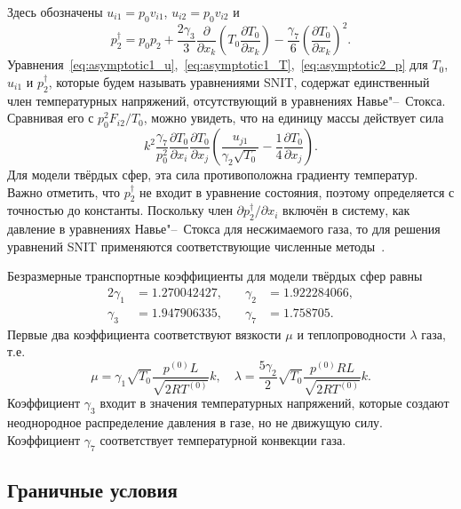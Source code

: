 \documentclass[10pt]{article}
\newcommand{\pder}[2][]{\frac{\partial#1}{\partial#2}}
\begin{document}
Здесь обозначены \(u_{i1} = p_0v_{i1}\), \(u_{i2} = p_0v_{i2}\) и
\begin{equation}\label{eq:dag_pressure}
    p_2^\dag = p_0 p_2
        + \frac{2\gamma_3}{3}\pder{x_k}\left(T_0\pder[T_0]{x_k}\right)
        - \frac{\gamma_7}{6}\left(\pder[T_0]{x_k}\right)^2.
\end{equation}
Уравнения~\eqref{eq:asymptotic1_u},~\eqref{eq:asymptotic1_T},~\eqref{eq:asymptotic2_p}
для \(T_0\), \(u_{i1}\) и \(p_2^\dag\), которые будем называть уравнениями SNIT,
содержат единственный член температурных напряжений, отсутствующий в уравнениях Навье"--~Стокса.
Сравнивая его с \(p_0^2F_{i2}/T_0\), можно увидеть, что на единицу массы действует сила
\begin{equation}\label{eq:gamma7_force}
    k^2\frac{\gamma_7}{p_0^2}\pder[T_0]{x_i}\pder[T_0]{x_j}\left(\frac{u_{j1}}{\gamma_2\sqrt{T_0}} - \frac{1}4\pder[T_0]{x_j}\right).
\end{equation}
Для модели твёрдых сфер, эта сила противоположна градиенту температур.
Важно отметить, что \(p_2^\dag\) не входит в уравнение состояния,
поэтому определяется с точностью до константы.
Поскольку член \(\partial{p_2^\dag}/\partial{x_i}\) включён в систему,
как давление в уравнениях Навье"--~Стокса для несжимаемого газа,
то для решения уравнений SNIT применяются соответствующие численные методы~\cite{Aoki2007}.

Безразмерные транспортные коэффициенты для модели твёрдых сфер равны
\begin{alignat*}{2}\label{eq:gamma_coeffs}
    \gamma_1 &= 1.270042427, &\quad \gamma_2 &= 1.922284066, \\
    \gamma_3 &= 1.947906335, &\quad \gamma_7 &= 1.758705.
\end{alignat*}
Первые два коэффициента соответствуют вязкости \(\mu\) и теплопроводности \(\lambda\) газа, т.е.
\begin{equation}\label{eq:mu_lambda}
    \mu = \gamma_1\sqrt{T_0} \frac{p^{(0)}L}{\sqrt{2RT^{(0)}}} k, \quad
    \lambda = \frac{5\gamma_2}{2}\sqrt{T_0} \frac{p^{(0)}RL}{\sqrt{2RT^{(0)}}} k.
\end{equation}
Коэффициент \(\gamma_3\) входит в значения температурных напряжений,
которые создают неоднородное распределение давления в газе,
но не движущую силу. Коэффициент \(\gamma_7\) соответствует
температурной конвекции газа.

\subsection{Граничные условия}
\end{document}
